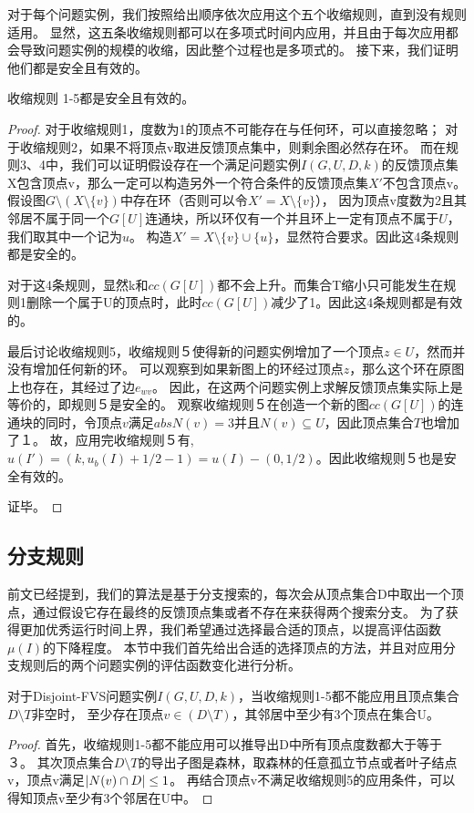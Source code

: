 对于每个问题实例，我们按照给出顺序依次应用这个五个收缩规则，直到没有规则适用。
显然，这五条收缩规则都可以在多项式时间内应用，并且由于每次应用都会导致问题实例的规模的收缩，因此整个过程也是多项式的。
接下来，我们证明他们都是安全且有效的。

\begin{lemma}
收缩规则 1-5都是安全且有效的。
\end{lemma}
\begin{proof}
对于收缩规则1，度数为1的顶点不可能存在与任何环，可以直接忽略；
对于收缩规则2，如果不将顶点v取进反馈顶点集中，则剩余图必然存在环。
而在规则3、4中，我们可以证明假设存在一个满足问题实例$I(G, U, D, k)$的反馈顶点集X包含顶点v，那么一定可以构造另外一个符合条件的反馈顶点集$X'$不包含顶点v。
假设图$G \setminus (X \setminus \{v\})$中存在环（否则可以令$X' = X \setminus \{v\}$），
因为顶点v度数为2且其邻居不属于同一个$G[U]$连通块，所以环仅有一个并且环上一定有顶点不属于$U$，我们取其中一个记为$u$。
构造$X' = X \setminus \{v\} \cup \{u\}$，显然符合要求。因此这4条规则都是安全的。

对于这4条规则，显然k和$cc(G[U])$都不会上升。而集合T缩小只可能发生在规则1删除一个属于U的顶点时，此时$cc(G[U])$减少了1。因此这4条规则都是有效的。

最后讨论收缩规则5，收缩规则５使得新的问题实例增加了一个顶点$z \in U$，然而并没有增加任何新的环。
可以观察到如果新图上的环经过顶点$z$，那么这个环在原图上也存在，其经过了边$e_{wv}$。
因此，在这两个问题实例上求解反馈顶点集实际上是等价的，即规则５是安全的。
观察收缩规则５在创造一个新的图$cc(G[U])$的连通块的同时，令顶点$v$满足$abs{N(v)} = 3$并且$N(v) \subseteq U$，因此顶点集合$T$也增加了１。
故，应用完收缩规则５有,$u(I') = (k, u_b(I) + 1/2 - 1) = u(I) - (0, 1/2)$。因此收缩规则５也是安全有效的。

证毕。
\end{proof}


\subsection{分支规则}
前文已经提到，我们的算法是基于分支搜索的，每次会从顶点集合D中取出一个顶点，通过假设它存在最终的反馈顶点集或者不存在来获得两个搜索分支。
为了获得更加优秀运行时间上界，我们希望通过选择最合适的顶点，以提高评估函数$\mu(I)$的下降程度。
本节中我们首先给出合适的选择顶点的方法，并且对应用分支规则后的两个问题实例的评估函数变化进行分析。 

\begin{lemma}
对于Disjoint-FVS问题实例$I(G,U,D,k)$，当收缩规则1-5都不能应用且顶点集合$D \setminus T$非空时，
至少存在顶点$v \in (D \setminus T)$，其邻居中至少有3个顶点在集合U。
\end{lemma}
\begin{proof}
首先，收缩规则1-5都不能应用可以推导出D中所有顶点度数都大于等于３。
其次顶点集合$D \setminus T$的导出子图是森林，取森林的任意孤立节点或者叶子结点v，顶点v满足$\left\vert N(v) \cap D \right\vert \le 1$。
再结合顶点v不满足收缩规则5的应用条件，可以得知顶点v至少有3个邻居在U中。
\end{proof}

